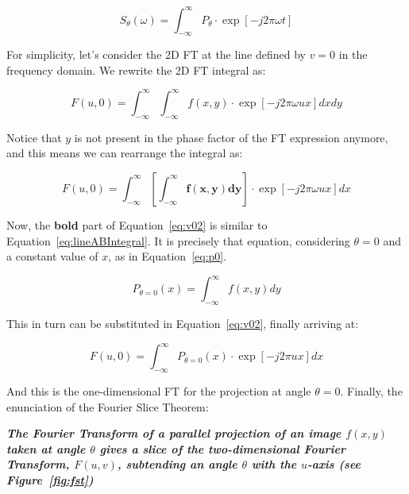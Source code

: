\begin{equation}
    \label{eq:1dFTproj}
    S_{\theta}(\omega) = \int_{-\infty}^{\infty} P_{\theta} \cdot \exp\left[
    -j2 \pi \omega t \right]
\end{equation}

For simplicity, let's consider the 2D \gls{FT} at the line defined by
$v=0$ in the frequency domain. We rewrite the 2D \gls{FT} integral as:

\begin{equation}
    \label{eq:v0}
    F(u, 0) = \int_{-\infty}^{\infty} \int_{-\infty}^{\infty} f(x, y)
    \cdot \exp \left[  -j 2\pi  \omega ux \right] dx dy
\end{equation}

Notice that $y$ is not present in the phase factor of the \gls{FT}
expression anymore, and this means we can rearrange the integral as:

\begin{equation}
    \label{eq:v02}
    F(u, 0) = \int_{-\infty}^{\infty} \left[ \mathbf{\int_{-\infty}^{\infty}
    f(x, y) dy }\right] \cdot \exp \left[  -j 2\pi  \omega ux \right] dx 
\end{equation}

Now, the \textbf{bold} part of Equation~\ref{eq:v02} is similar to
Equation~\ref{eq:lineABIntegral}. It is precisely that equation,
considering $\theta=0$ and a constant value of $x$, as in
Equation~\ref{eq:p0}.

\begin{equation}
    \label{eq:p0}
    P_{\theta=0} (x) = \int_{-\infty}^{\infty} f(x, y) dy
\end{equation}

This in turn can be substituted in Equation~\ref{eq:v02}, finally
arriving at:

\begin{equation}
    \label{eq:FTP}
    F(u, 0) = \int_{-\infty}^{\infty} P_{\theta=0} (x) \cdot \exp \left[
    -j 2\pi ux \right] dx
\end{equation}

And this is the one-dimensional \gls{FT} for the projection at angle
$\theta=0$. Finally, the enunciation of the Fourier Slice Theorem:
\begin{center}
    \begin{minipage}{0.8\textwidth}

        \noindent\textbf{\emph{The Fourier Transform of a parallel
                projection  of an image $f(x, y)$ taken at angle
                $\theta$ gives a slice of the two-dimensional Fourier
                Transform, $F(u, v)$, subtending an angle $\theta$ with
                the $u$-axis (see Figure~\ref{fig:fst})}}

    \end{minipage}
\end{center}

